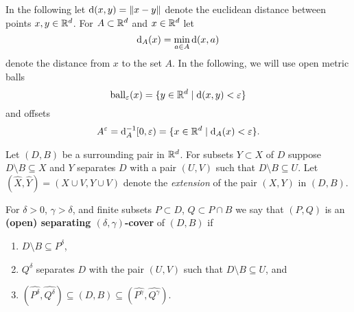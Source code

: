 
In the following let $\mathrm{d}(x, y) = \|x - y\|$ denote the euclidean distance between points $x,y\in \mathbb{R}^d$.
For $A\subset\mathbb{R}^d$ and $x\in \mathbb{R}^d$ let
\[\mathrm{d}_A(x) = \min_{a\in A}\mathrm{d}(x, a)\]
denote the distance from $x$ to the set $A$.
In the following, we will use open metric balls
\[\mathrm{ball}_\varepsilon(x) = \{y\in\mathbb{R}^d\mid \mathrm{d}(x, y) < \varepsilon\}\]
and offsets
\[A^\varepsilon = \mathrm{d}_A^{-1}[0, \varepsilon) = \{x\in \mathbb{R}^d\mid \mathrm{d}_A(x) < \varepsilon\}.\]%

Let $(D, B)$ be a surrounding pair in $\mathbb{R}^d$.
For subsets $Y\subset X$ of $D$ suppose $D\setminus B \subseteq X$ and $Y$ separates $D$ with a pair $(U, V)$ such that $D\setminus B \subseteq U$.
Let $(\hat{X},\hat{Y}) = (X\cup V, Y\cup V)$ denote the \emph{extension} of the pair $(X, Y)$ in $(D, B)$.

\begin{definition}
  For $\delta > 0$, $\gamma > \delta$, and finite subsets $P\subset D$, $Q\subset P\cap B$ we say that $(P, Q)$ is an \textbf{(open) separating $(\delta,\gamma)$-cover} of $(D, B)$ if
  \begin{enumerate}[label=(\alph*)]
    \item $D\setminus B \subseteq P^\delta$,
    \item $Q^\delta$ separates $D$ with the pair $(U, V)$ such that $D\setminus B\subseteq U$, and
    \item $(\hat{P^\delta}, \hat{Q^\delta})\subseteq (D, B)\subseteq (\hat{P^\gamma}, \hat{Q^\gamma})$.
  \end{enumerate}
\end{definition}

